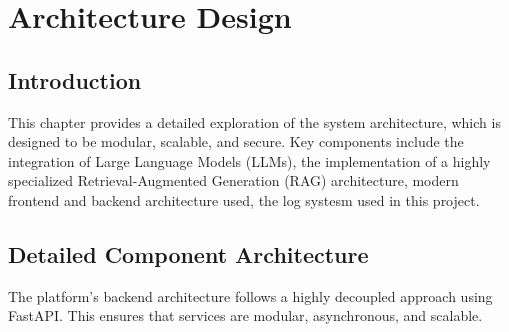 \chapter{Architecture Design}
\label{chap:architecture_design}

\section*{Introduction}
This chapter provides a detailed exploration of the system architecture, which is designed to be modular, scalable, and secure. Key components include the integration of Large Language Models (LLMs), the implementation of a highly specialized Retrieval-Augmented Generation (RAG) architecture, modern frontend and backend architecture used, the log systesm used in this project.

\pagebreak

\section{Detailed Component Architecture}

The platform's backend architecture follows a highly decoupled approach using FastAPI. This ensures that services are modular, asynchronous, and scalable.
